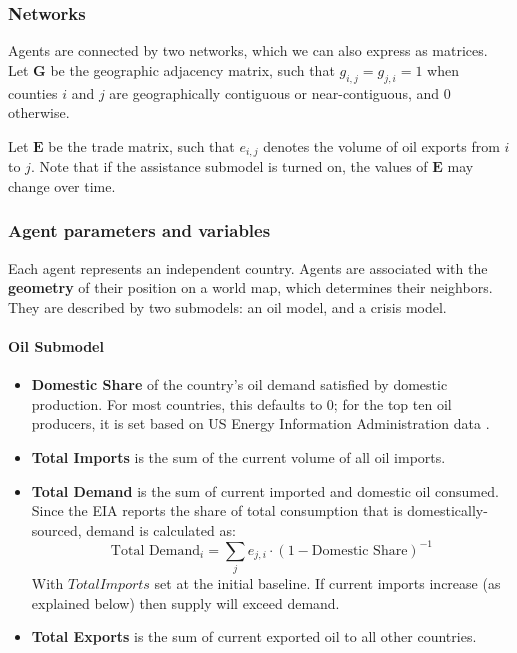 \documentclass{article}
\begin{document}
\subsubsection{Networks}

Agents are connected by two networks, which we can also express as matrices. Let $\mathbf{G}$ be the geographic adjacency matrix, such that $g_{i,j}=g_{j,i}=1$ when counties $i$ and $j$ are geographically contiguous or near-contiguous, and $0$ otherwise. 

Let $\mathbf{E}$ be the trade matrix, such that $e_{i,j}$ denotes the volume of oil exports from $i$ to $j$. Note that if the assistance submodel is turned on, the values of $\mathbf{E}$ may change over time.

\subsubsection{Agent parameters and variables}

Each agent represents an independent country. Agents are associated with the \textbf{geometry} of their position on a world map, which determines their neighbors. They are described by two submodels: an oil model, and a crisis model.

\paragraph{Oil Submodel}
\begin{itemize}
	\item \textbf{Domestic Share} of the country's oil demand satisfied by domestic production. For most countries, this defaults to 0; for the top ten oil producers, it is set based on US Energy Information Administration data \citep{eia_2013}.
	\item \textbf{Total Imports} is the sum of the current volume of all oil imports. 
	\item \textbf{Total Demand} is the sum of current imported and domestic oil consumed. Since the EIA reports the share of total consumption that is domestically-sourced, demand is calculated as: $$\text{Total Demand}_i = \sum_j e_{j,i} \cdot (1 - \text{Domestic Share})^{-1}$$
	With $Total Imports$ set at the initial baseline. If current imports increase (as explained below) then supply will exceed demand. 
	\item \textbf{Total Exports} is the sum of current exported oil to all other countries.
\end{itemize}
\end{document}
